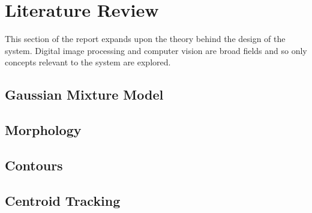 \chapter{Literature Review}
This section of the report expands upon the theory behind the design of the system. Digital image processing and computer vision are broad fields and so only concepts relevant to the system are explored.





\section{Gaussian Mixture Model}


\section{Morphology}

\section{Contours}

\section{Centroid Tracking}